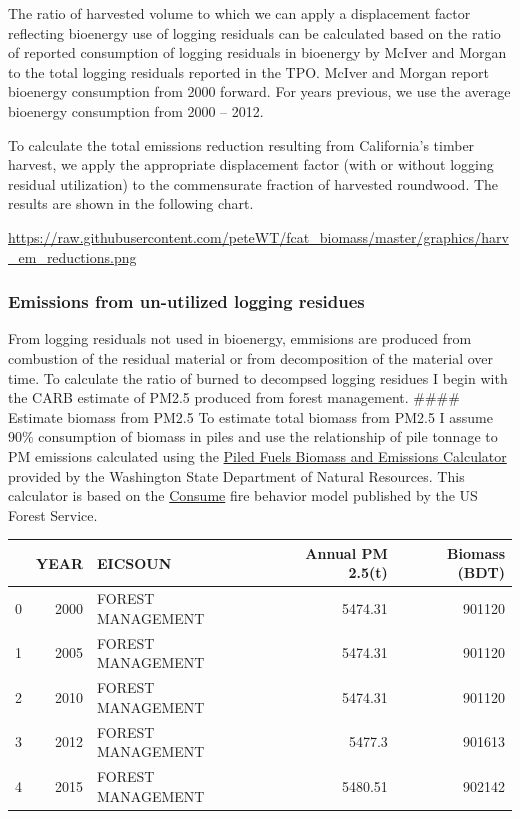 \documentclass[a4paper]{article}
\begin{document}
The ratio of harvested volume to which we can apply a displacement
factor reflecting bioenergy use of logging residuals can be calculated
based on the ratio of reported consumption of logging residuals in
bioenergy by McIver and Morgan to the total logging residuals reported
in the TPO. McIver and Morgan report bioenergy consumption from 2000
forward. For years previous, we use the average bioenergy consumption
from 2000 -- 2012.

To calculate the total emissions reduction resulting from California's
timber harvest, we apply the appropriate displacement factor (with or
without logging residual utilization) to the commensurate fraction of
harvested roundwood. The results are shown in the following chart.

\url{https://raw.githubusercontent.com/peteWT/fcat_biomass/master/graphics/harv_em_reductions.png}
\subsubsection{Emissions from un-utilized logging residues}
\label{sec:orgheadline8}

From logging residuals not used in bioenergy, emmisions are produced
from combustion of the residual material or from decomposition of the
material over time. To calculate the ratio of burned to decompsed
logging residues I begin with the CARB estimate of PM2.5 produced from
forest management. \#\#\#\# Estimate biomass from PM2.5 To estimate total
biomass from PM2.5 I assume 90\% consumption of biomass in piles and use
the relationship of pile tonnage to PM emissions calculated using the
\href{http://depts.washington.edu/nwfire/piles/}{Piled Fuels Biomass and
Emissions Calculator} provided by the Washington State Department of
Natural Resources. This calculator is based on the
\href{http://www.fs.fed.us/pnw/fera/research/smoke/consume/index.shtml}{Consume}
fire behavior model published by the US Forest Service.

\begin{center}
\begin{tabular}{rrlrr}
 & YEAR & EICSOUN & Annual PM 2.5(t) & Biomass (BDT)\\
\hline
0 & 2000 & FOREST MANAGEMENT & 5474.31 & 901120\\
1 & 2005 & FOREST MANAGEMENT & 5474.31 & 901120\\
2 & 2010 & FOREST MANAGEMENT & 5474.31 & 901120\\
3 & 2012 & FOREST MANAGEMENT & 5477.3 & 901613\\
4 & 2015 & FOREST MANAGEMENT & 5480.51 & 902142\\
\end{tabular}

\end{center}
\end{document}
